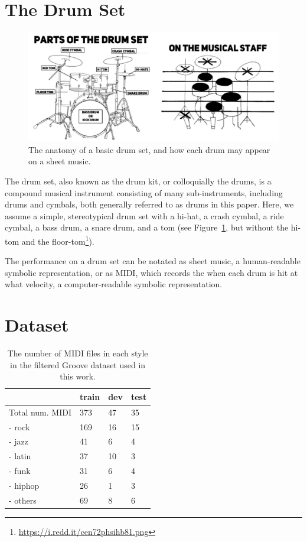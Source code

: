 \documentclass[letterpaper]{article} %
\begin{document}
\section{The Drum Set}
\begin{figure}[t!]
\centering
\includegraphics[scale=0.53]{images/drumset-resized.png}
\caption{The anatomy of a basic drum set, and how each drum may appear on a sheet music.}
\label{fig:drumset}
\end{figure}

The drum set, also known as the drum kit, or colloquially the drums, is a compound musical instrument consisting of many sub-instruments, including drums and cymbals, both generally referred to as drums in this paper. Here, we assume a simple, stereotypical drum set with a hi-hat, a crash cymbal, a ride cymbal, a bass drum, a snare drum, and a tom (see Figure~\ref{fig:drumset}, but without the hi-tom and the floor-tom\footnote{\url{https://i.redd.it/cen72phsihb81.png}}).

The performance on a drum set can be notated as sheet music, a human-readable symbolic representation, or as MIDI, which records the when each drum is hit at what velocity, a computer-readable symbolic representation.

\section{Dataset}
\begin{table}[t!]
\centering
\begin{tabular}{llll}
\toprule
& train & dev & test \\ \midrule
Total num. MIDI   & 373   & 47  & 35   \\
- rock &   169    &  16   &  15    \\
- jazz &   41    &  6   &   4   \\
- latin &   37    &  10   &  3    \\
- funk &    31   &  6   &   4   \\
- hiphop &   26    &  1   &    3  \\
- others &   69    &  8   &   6   \\
\bottomrule
\end{tabular}
\caption{The number of MIDI files in each style in the filtered Groove dataset used in this work.}
\label{fig:dataset_stats}
\end{table}
\end{document}

